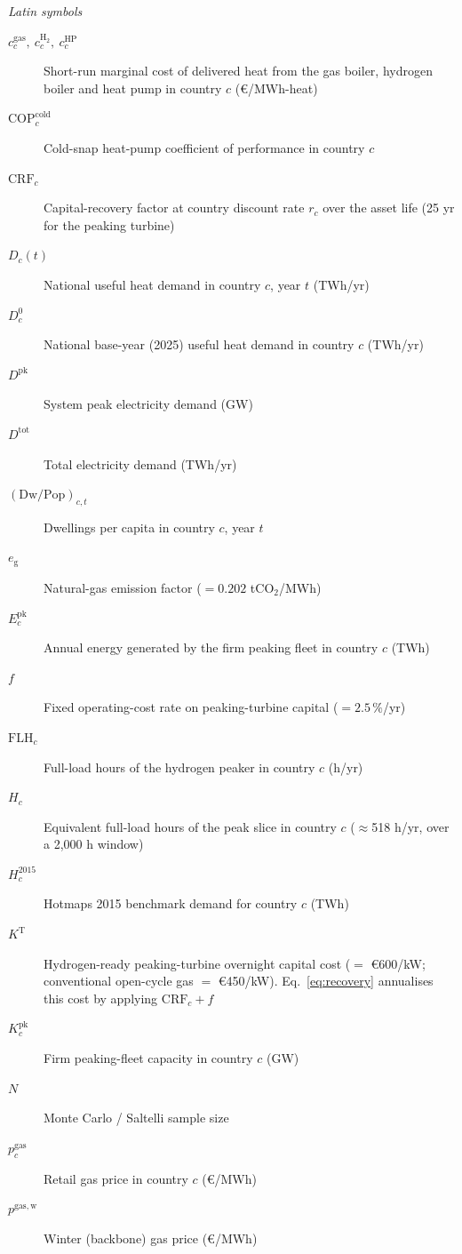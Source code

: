 \textit{Latin symbols}
\begin{description}
 \item[$c^{\mathrm{gas}}_{c},\ c^{\mathrm{H_2}}_{c},\ c^{\mathrm{HP}}_{c}$] Short-run marginal cost of delivered heat from the gas boiler, hydrogen boiler and heat pump in country $c$ (\euro{}/MWh-heat)
 \item[$\mathrm{COP}^{\mathrm{cold}}_{c}$] Cold-snap heat-pump coefficient of performance in country $c$
 \item[$\mathrm{CRF}_{c}$] Capital-recovery factor at country discount rate $r_{c}$ over
the asset life (25 yr for the peaking turbine)
 \item[$D_{c}(t)$] National useful heat demand in country $c$, year $t$ (TWh/yr)
 \item[$D_{c}^{0}$] National base-year (2025) useful heat demand in country $c$ (TWh/yr)
 \item[$D^{\mathrm{pk}}$] System peak electricity demand (GW)
 \item[$D^{\mathrm{tot}}$] Total electricity demand (TWh/yr)
 \item[$(\mathrm{Dw}/\mathrm{Pop})_{c,t}$] Dwellings per capita in country $c$, year $t$
 \item[$e_{\mathrm{g}}$] Natural-gas emission factor ($=0.202$ tCO$_2$/MWh)
  \item[$E^{\mathrm{pk}}_{c}$] Annual energy generated by the firm peaking fleet in country $c$ (TWh)
 \item[$f$] Fixed operating-cost rate on peaking-turbine capital ($=2.5\,\%$/yr)
 \item[$\mathrm{FLH}_{c}$] Full-load hours of the hydrogen peaker in country $c$ (h/yr)
 \item[$H_{c}$] Equivalent full-load hours of the peak slice in country $c$ ($\approx$518 h/yr, over a 2{,}000 h window)
 \item[$H_{c}^{2015}$] Hotmaps 2015 benchmark demand for country $c$ (TWh)
 \item[$K^{\mathrm{T}}$] Hydrogen-ready peaking-turbine overnight capital cost ($=$
\euro{}600/kW; conventional open-cycle gas $=$ \euro{}450/kW). Eq.~\eqref{eq:recovery}
annualises this cost by applying $\mathrm{CRF}_{c}+f$
 \item[$K^{\mathrm{pk}}_{c}$] Firm peaking-fleet capacity in country $c$ (GW)
 \item[$N$] Monte Carlo / Saltelli sample size
 \item[$p^{\mathrm{gas}}_{c}$] Retail gas price in country $c$ (\euro{}/MWh)
 \item[$p^{\mathrm{gas,w}}$] Winter (backbone) gas price (\euro{}/MWh)

\end{description}
